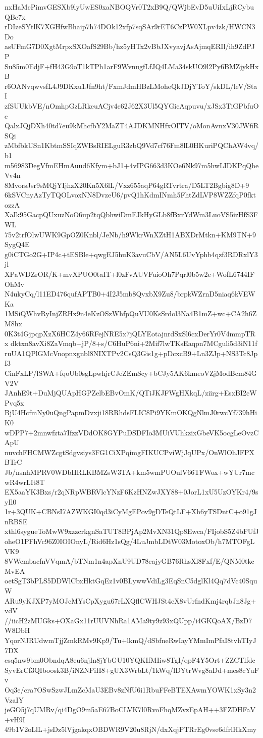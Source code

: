nxHaMcPimvGESXb9lyUwES0xaNBOQVr0T2xB9Q/QWjbEvD5uUiIxLjRCybuQBe7x
rDIzeSYtlK7XGHfwBhaip7h74DOk12xfp7sqSAr9rET6CzPW0XLpv4zk/HWCN3Do
asUFmG7D0XgtMrpxSXOafS29Bb/hz5yHTx2vBbJXvyavjAsAjmqERIl/ih9ZdPJP
Su85m0EdjF+fH43G9oT1kTPh1arF9WvnugfLfJQ4LMa34skUO9l2Py6BMZjykHxB
r6OANvqwvsfL4J9DKxu1Jfn9ht/FxmJdmHBzLMoheQkJDjYToY/skDL/leV/StaI
zfSUUkbVE/nOmhpGzLRkeuACjv4c62J62X3Ul5QYGicAqpuvu/xJSx3TiGPbfuOe
QalxJQjDXh40td7eu9kMhcfbY2MaZT4AJDKMNHfxOITV/oMonAvnxV30JWfiRSQi
zMbfbkUSn1KbtmSSIqZWBsRIELguR3zbQ9Vd7cf76Fm8lL0HKuriPQChAW4vq/b1
m56983DegVfmEHmAuud6Kfym+bJ1+4vIPG663d3KOe6Nk97m5hwLIDKPqQheVv4n
8MvorsJsr9sMQjYIjhzX20Kn5X6lL/Vxz655aqP64gRTvrtra/D5LT2Bgbig8D+9
6kSVCnyAzTyTQOLvoxNN8DvzeU6/pvQ1hKdmINmh5FhtZdLVP8WZZfqP0fktozzA
XaIk95GacpQUxuzNoO6up2tqQbhwiDmFJkHyGLb8fBxrYdWm3LuoVS5izHfS3FWL
75v2trfOlwUWK9GpOZ0Knbl/JeNb/h9WkrWnXZtH1ABXDrMtkn+KM9TN+9SygQ4E
g0iCTGo2G+IP4c+tESBle+qwgEJ5huK3avuCbV/AN5L6UvYphb4qzf3RDRxlY3jl
XPaWDZrOR/K+mvXPUO0taIT+l0zFvAUVFuioOh7Pqrl0b5w2e+WofL6744IFOhMv
N4ukyCq/l11ED476qufAPTB0+4I2J5mb8QvxbX9Zu8/brpkWZrnD5niaq6kVEWKa
1MSiQWhvRyInjZRHx9n4eKzOSzWhfpQuVU0KsSrdol3Na4B1mZ+wc+CA2h6ZM8hx
0K3t4GjpqpXzX6HCZ4y66RFejNRE5x7jQLYEotajnrdSxSl6cxDerYr0V4mmpTRx
dktxn8avXi8ZaVmqb+jP/8+s/C6HuP6ni+2Mif7lwTKsEaqpn7MCguli5d3iN11f
ruUA1QPlGMcVnopnxgnbl8NIXTPv2CsQ3Gis1g+pDcxcB9+Ln3ZJp+NS3Tc8JpI3
CinFxLP/lSWA+fqoUb0sgLpwhjrCJeZEmScy+bCJy5AK6kmeoVZjModBcm84GV2V
JAnhE9t+DuMjQUApHGPZelbEBvOmK/QTiJKJFWgHXkqL/ziirg+EsxBI2cWPvq5x
BjU4HcfmNy0uQngPapmDvxji18RRhdsFLIC8Pi9YKmOKQgNlmJ0rwcYf739hHiK0
wDPP7+2mnwfzta7IfzzVDdOK8GYPuDSDFIo3MUiVUhkzixGbeVK5ocgLeOvzCApU
nuvchFHCMWZcgtSdgvsiys3FG1CiXPqimgFIKUCPviWjJqUPx/OnWlOhJFPXBTrC
Jb/nsnhMPRV0WDbHRLKBMZsW3TA+km5wmPUOulV66TFWox+wYUr7mcwR4wrLIt8T
EX5aaYK3Bxs/r2qNRpWBRVlcYNzF6KzHNZwJXY88+0JorL1xU5UzOYKr4/9syIl0
1r+3QUK+CBNsI7AZWKGI0qd3iCyMgEPov9gDTeQtLF+Xh6yTSDntC+o91gJnRBSE
xthl6sygueToMwW9xzzcrkgnSaTUT8BPjAp2MvXN31Qp8Ewca/FIjobS5Z4bFUfJ
oheO1PFhVc96Z0IOIOnyL/Rid6Hz1sQg/4LuJmbLDtW03MotoxOb/h7MTOFgLVK9
8VWcmbacfnVVqmA/bTNm1n4apXnU9UD78cajyGB76RhsXl8Fxf/E/QNM0tkcMvEA
oetSgT3bPLS5DDWlCbxHktGqEz1v0BLywwVdiLg3EqSnC5dglKl4Qq7dVc40SquW
ARu9yKJXP7yMOJcMYsCpXygu67rLXQflCWHJSt4eX8vUrfndKmj4rqbJn8Jg+vdV
//iicH2zMUGks+OXaGx11rUUVNhRa1AMa9ty9z93xQUpp/i4GKQoAX/BzD7W8DbH
YqorNJRUdwmTjjZmkRMv9Kp9/Tu+lkmQ/dSbfneRwIayYMmImPfaI8tvhTIyJ7DX
csq5nw9bm0ObndqA8eu6njIn8jYbGU10YQKIfMIiw8TgI/qpF4Y5Ort+ZZCTlfdc
SyvErCf3QIboosk3B/iNZNPiH8+gUX3WrbLt/1kWq/lDYtrWvg8aDd+mes8cYuFv
Oq3e/cra7OSwSzwJLmZcMaU3EBv8zNfU6i1RbuFFeBTEXAwmYOWK1xSy3n2VzaIY
jeGO5j7qUMRv/qi4DgO9m5aE67BoCLVK7l0RvoFhqMZvzEpAH++3FZDHFaV+vH9I
49b1V2oLlL+jsDz5lVjgakqxOBDWR9V20u8RjN/dxXqjPTRrEg0vse6dfrlHkXmy

